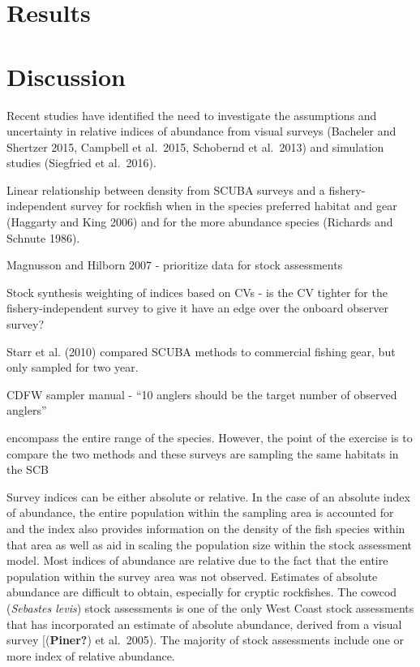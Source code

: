 \documentclass[]{elsarticle} %
\begin{document}
\hypertarget{results}{%
\section{Results}\label{results}}

\hypertarget{discussion}{%
\section{Discussion}\label{discussion}}

Recent studies have identified the need to investigate the assumptions
and uncertainty in relative indices of abundance from visual surveys
(Bacheler and Shertzer 2015, Campbell et al.~2015, Schobernd et
al.~2013) and simulation studies (Siegfried et al.~2016).

Linear relationship between density from SCUBA surveys and a
fishery-independent survey for rockfish when in the species preferred
habitat and gear (Haggarty and King 2006) and for the more abundance
species (Richards and Schnute 1986).

Magnusson and Hilborn 2007 - prioritize data for stock assessments

Stock synthesis weighting of indices based on CVs - is the CV tighter
for the fishery-independent survey to give it have an edge over the
onboard observer survey?

Starr et al. (2010) compared SCUBA methods to commercial fishing gear,
but only sampled for two year.

CDFW sampler manual - ``10 anglers should be the target number of
observed anglers''

encompass the entire range of the species. However, the point of the
exercise is to compare the two methods and these surveys are sampling
the same habitats in the SCB

Survey indices can be either absolute or relative. In the case of an
absolute index of abundance, the entire population within the sampling
area is accounted for and the index also provides information on the
density of the fish species within that area as well as aid in scaling
the population size within the stock assessment model. Most indices of
abundance are relative due to the fact that the entire population within
the survey area was not observed. Estimates of absolute abundance are
difficult to obtain, especially for cryptic rockfishes. The cowcod
(\emph{Sebastes levis}) stock assessments is one of the only West Coast
stock assessments that has incorporated an estimate of absolute
abundance, derived from a visual survey {[}(\textbf{Piner?}) et
al.~2005). The majority of stock assessments include one or more index
of relative abundance.
\end{document}
